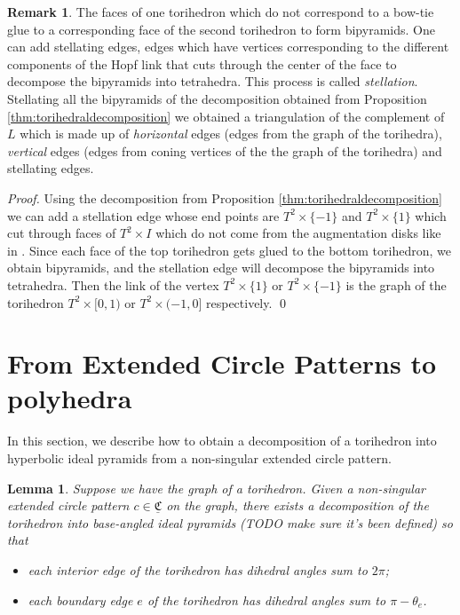 \documentclass[11pt]{amsart}
\newcommand{\CCC}{{\underline{\mathfrak{C}}}}
\theoremstyle{plain}
\newtheorem{lemma}[theorem]{Lemma}
\theoremstyle{definition}
\newtheorem{remark}[theorem]{Remark}
\begin{document}
\begin{remark}\label{cor:triangulation}
The faces of one torihedron which do not correspond to a bow-tie glue to a corresponding face of the second torihedron to form bipyramids. One can add stellating edges, edges which have vertices corresponding to the different components of the Hopf link that cuts through the center of the face to decompose the bipyramids into tetrahedra. This process is called {\it stellation}. Stellating all the bipyramids of the decomposition obtained from Proposition \ref{thm:torihedraldecomposition} we obtained a triangulation of the complement of $L$ which is made up of {\it horizontal} edges (edges from the graph of the torihedra), {\it vertical} edges (edges from coning vertices of the the graph of the torihedra) and stellating edges. 
\end{remark}

{\it Proof.}  Using the decomposition from Proposition \ref{thm:torihedraldecomposition} we can add a stellation edge whose end points are $T^2 \times \{-1\}$ and $T^2 \times \{1\}$ which cut through faces of $T^2 \times I$ which do not come from the augmentation disks like in \cite{CKP2}. Since each face of the top torihedron gets glued to the bottom torihedron, we obtain bipyramids, and the stellation edge will decompose the bipyramids into tetrahedra. Then the link of the vertex  $T^2 \times \{1\}$ or $T^2 \times \{-1\}$ is the graph of the torihedron $T^2 \times [0,1)$ or $T^2 \times (-1,0]$ respectively. \qed



\section{From Extended Circle Patterns to polyhedra}

In this section, we describe how to obtain a
decomposition of a torihedron
into hyperbolic ideal pyramids
from a non-singular extended circle pattern.

\begin{lemma}
Suppose we have the graph of a torihedron.
Given a non-singular extended circle pattern $c \in \CCC$ on the graph,
there exists a decomposition of the torihedron
into base-angled ideal pyramids (TODO make sure it's been defined) so that
	\begin{itemize}
		\item each interior edge of the torihedron has dihedral angles sum to $2\pi$;
		\item each boundary edge $e$ of the torihedron has dihedral angles sum to
			$\pi - \theta_e$.
	\end{itemize}
\end{lemma}
\end{document}
